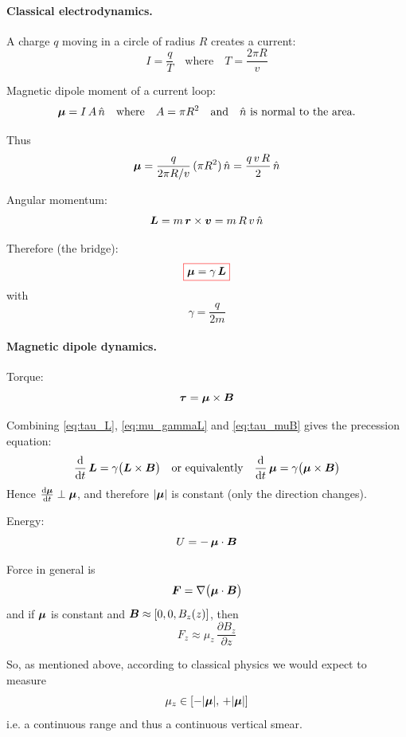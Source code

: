 \paragraph{\textbf{Classical electrodynamics.}}

A charge $q$ moving in a circle of radius $R$ creates a current:
\[
I = \frac{q}{T}
\quad\text{where}\quad
T = \frac{2\pi R}{v}
\]

Magnetic dipole moment of a current loop:
\[
{\boldsymbol{\mu}} = I\,A\,\hat{n}
\quad\text{where}\quad
A = \pi R^{2}
\quad\text{and}\quad
\hat{n}\ \text{is normal to the area.}
\]

Thus
\[
{\boldsymbol{\mu}}
= \frac{q}{2\pi R/v}\,(\pi R^{2})\,\hat{n}
= \frac{q\,v\,R}{2}\,\hat{n}
\]

Angular momentum:
\[
{\boldsymbol{L}} = m\,{\boldsymbol{r}}\times{\boldsymbol{v}} = m\,R\,v\,\hat{n}
\]

Therefore (the bridge):
\begin{equation}\label{eq:mu_gammaL}
\fcolorbox{red}{white}{\(\vect{\mu} = \gamma\,\vect{L}\)}
\end{equation}
with
\[
\gamma = \frac{q}{2m}
\]

\paragraph{\textbf{Magnetic dipole dynamics.}}

Torque:
\begin{equation}\label{eq:tau_muB}
{\boldsymbol{\tau}} = {\boldsymbol{\mu}} \times {\boldsymbol{B}}
\end{equation}

Combining \eqref{eq:tau_L}, \eqref{eq:mu_gammaL} and \eqref{eq:tau_muB} gives the precession equation:
\[
\frac{\mathrm{d}}{\mathrm{d} t}\,{\boldsymbol{L}} = \gamma\bigl({\boldsymbol{L}}\times{\boldsymbol{B}}\bigr)
\quad\text{or equivalently}\quad
\frac{\mathrm{d}}{\mathrm{d} t}\,{\boldsymbol{\mu}} = \gamma\bigl({\boldsymbol{\mu}}\times{\boldsymbol{B}}\bigr)
\]
Hence $\frac{\mathrm{d}{\boldsymbol{\mu}}}{\mathrm{d} t}\perp{\boldsymbol{\mu}}$, and therefore $\lvert{\boldsymbol{\mu}}\rvert$ is constant (only the direction changes).

Energy:
\[
U = -\,{\boldsymbol{\mu}}\cdot{\boldsymbol{B}}
\]

Force in general is
\[
{\boldsymbol{F}} = \nabla\bigl({\boldsymbol{\mu}}\cdot{\boldsymbol{B}}\bigr)
\]
and if ${\boldsymbol{\mu}}$ is constant and ${\boldsymbol{B}}\approx [0,0,B_z(z)]$, then
\[
F_{z} \approx \mu_{z}\,\frac{\partial B_{z}}{\partial z}
\]

So, as mentioned above, according to classical physics we would expect to measure
\[
\mu_{z}\in[-\lvert{\boldsymbol{\mu}}\rvert,\,+\lvert{\boldsymbol{\mu}}\rvert]
\]
i.e. a continuous range and thus a continuous vertical smear.

